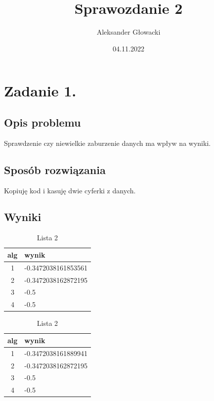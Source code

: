 \documentclass[12pt]{article}
\author{Aleksander Głowacki}
\title{Sprawozdanie 2}
\date{04.11.2022}
\begin{document}
\maketitle

\tableofcontents

\newpage
\section{Zadanie 1.}


\subsection{Opis problemu}

Sprawdzenie czy niewielkie zaburzenie danych ma  wpływ na wyniki.

\subsection{Sposób rozwiązania}
Kopiuję kod i kasuję dwie cyferki z danych.
\subsection{Wyniki}

\begin{table}[!htb]
    \caption{Porównanie wyników we Float 32}
    \begin{minipage}{.5\linewidth}
      \caption{Lista 1}
      \centering
        \begin{tabular}{|l|l|}
            \hline 
            \textbf{alg} & \textbf{wynik} \\
            \hline
            \ 1 & -0.3472038161853561\\
            \hline
            \ 2 & -0.3472038162872195\\
            \hline
            \ 3 & -0.5\\
            \hline
            \ 4 & -0.5\\
            \hline
        \end{tabular} 
    \end{minipage}%
    \begin{minipage}{.5\linewidth}
      \centering
        \caption{Lista 2}
            \begin{tabular}{|l|l|}
                \hline 
                \textbf{alg} & \textbf{wynik} \\
                \hline
                \ 1 & -0.3472038161889941\\
                \hline
                \ 2 & -0.3472038162872195\\
                \hline
                \ 3 & -0.5\\
                \hline
                \ 4 & -0.5\\
                \hline
            \end{tabular} 
    \end{minipage} 
\end{table}
\end{document}
